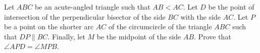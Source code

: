 Let $ABC$ be an acute-angled triangle such that $AB<AC$. Let $D$ be the point of intersection of the perpendicular bisector of the side $BC$ with the side $AC$. Let $P$ be a point on the shorter arc $AC$ of the circumcircle of the triangle $ABC$ such that $DP \parallel BC$. Finally, let $M$ be the midpoint of the side $AB$. Prove that $\angle APD=\angle MPB$.
